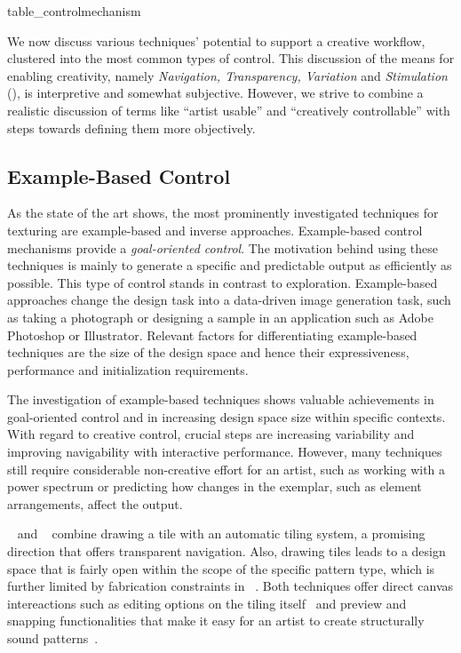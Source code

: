 {table_controlmechanism}

We now discuss various techniques' potential to support a creative workflow, clustered into the most common types of control. This discussion of the means for enabling creativity, namely \textit{Navigation, Transparency, Variation} and \textit{Stimulation} (), is interpretive and somewhat subjective. However, we strive to combine a realistic discussion of terms like ``artist usable'' and ``creatively controllable'' with steps towards defining them more objectively.

\subsection{Example-Based Control}
\label{subsubsec:analysis_creative_means_example}

As the state of the art shows, the most prominently investigated techniques for texturing are example-based and inverse approaches. Example-based control mechanisms provide a \textit{goal-oriented control}. The motivation behind using these techniques is mainly to generate a specific and predictable output as efficiently as possible. This type of control stands in contrast to exploration. Example-based approaches change the design task into a data-driven image generation task, such as taking a photograph or designing a sample in an application such as Adobe Photoshop or Illustrator. Relevant factors for differentiating example-based techniques are the size of the design space and hence their expressiveness, performance and initialization requirements. 

The investigation of example-based techniques shows valuable achievements in goal-oriented control and in increasing design space size within specific contexts. With regard to creative control, crucial steps are increasing variability and improving navigability with interactive performance. However, many techniques still require considerable non-creative effort for an artist, such as working with a power spectrum or predicting how changes in the exemplar, such as element arrangements, affect the output.

\citeauthor*{tu_2020_cct}~\cite{tu_2020_cct} and \citeauthor*{bian_2018_tpd}~\cite{bian_2018_tpd} combine drawing a tile with an automatic tiling system, a promising direction that offers transparent navigation. Also, drawing tiles leads to a design space that is fairly open within the scope of the specific pattern type, which is further limited by fabrication constraints in \citeauthor*{bian_2018_tpd}~\cite{bian_2018_tpd}. Both techniques offer direct canvas intereactions such as editing options on the tiling itself~\cite{tu_2020_cct} and preview and snapping functionalities that make it easy for an artist to create structurally sound patterns~\cite{bian_2018_tpd}. 


